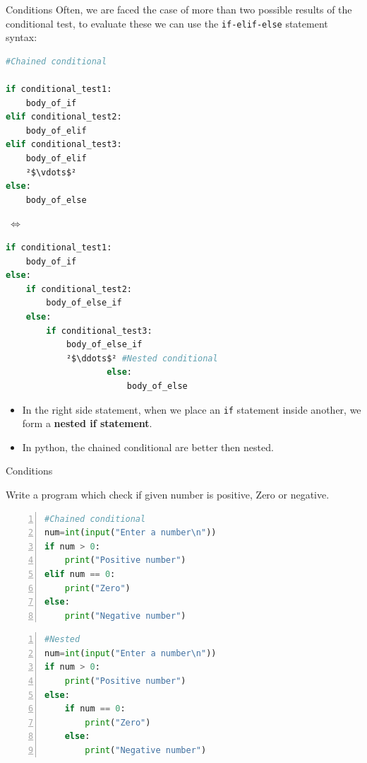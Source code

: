 \begin{frame}[fragile]{Conditions}
    Often, we are faced the case of more than two possible results of the conditional test, to evaluate
    these we can use the \texttt{if-elif-else} statement syntax:



    \lstset{escapechar=\²}
\begin{minipage}{.3 \textwidth}
\begin{lstlisting}[showstringspaces=false,language=python]
#Chained conditional

if conditional_test1:
    body_of_if
elif conditional_test2:
    body_of_elif
elif conditional_test3:
    body_of_elif    
    ²$\vdots$²
else:
    body_of_else
\end{lstlisting}
\end{minipage}
\pause
\begin{minipage}{.15\textwidth}
$\ \Longleftrightarrow$
\end{minipage}
\begin{minipage}{.5 \textwidth}
\begin{lstlisting}[showstringspaces=false,language=python]
if conditional_test1:
    body_of_if
else:
    if conditional_test2:
        body_of_else_if
    else:
        if conditional_test3:
            body_of_else_if
            ²$\ddots$² #Nested conditional
                    else:
                        body_of_else
\end{lstlisting}
\end{minipage}   
\begin{itemize}
    \item In the right side statement, when we place an \texttt{if} statement inside another, we form a {\bf nested if statement}.
    \item In python, the chained conditional are better then nested.
\end{itemize}
\end{frame}
\begin{frame}[fragile]{Conditions}
    \begin{example}
        Write a program which check if given number is positive, Zero or negative. 
     \end{example}
     \pause      

     \begin{lstlisting}[numbers=left,showstringspaces=false,language=python]
#Chained conditional
num=int(input("Enter a number\n"))
if num > 0:
    print("Positive number")
elif num == 0:
    print("Zero")
else:
    print("Negative number")
\end{lstlisting}
\pause
\begin{lstlisting}[numbers=left,showstringspaces=false,language=python]
#Nested
num=int(input("Enter a number\n"))
if num > 0:
    print("Positive number")
else:
    if num == 0:
        print("Zero")
    else:
        print("Negative number")
        \end{lstlisting}
\end{frame}
